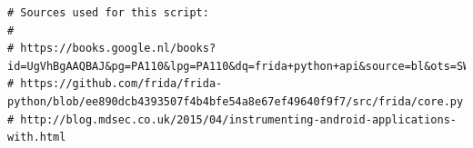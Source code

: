 \documentclass[12pt, a4paper]{report}
\begin{document}
\begin{appendices}
\begin{lstlisting}[frame=single, breaklines=true]
# Sources used for this script:
#
# https://books.google.nl/books?id=UgVhBgAAQBAJ&pg=PA110&lpg=PA110&dq=frida+python+api&source=bl&ots=SWy8q9e9PU&sig=cSHShKFcICRZVuFdMwAMG0qmyHo&hl=nl&sa=X&ved=0ahUKEwjczvKdkMrJAhUEDw8KHbIkDmYQ6AEIWTAH#v=onepage&q=frida%20python%20api&f=false
# https://github.com/frida/frida-python/blob/ee890dcb4393507f4b4bfe54a8e67ef49640f9f7/src/frida/core.py
# http://blog.mdsec.co.uk/2015/04/instrumenting-android-applications-with.html


\end{lstlisting}




\end{appendices}
\end{document}
